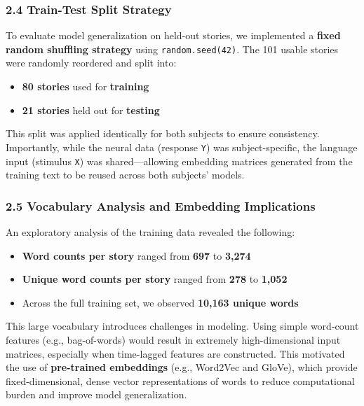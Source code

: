 \documentclass[11pt]{article}
\begin{document}
\hypertarget{train-test-split-strategy}{%
\subsubsection{2.4 Train-Test Split
Strategy}\label{train-test-split-strategy}}

To evaluate model generalization on held-out stories, we implemented a
\textbf{fixed random shuffling strategy} using \texttt{random.seed(42)}.
The 101 usable stories were randomly reordered and split into:

\begin{itemize}
\item
  \textbf{80 stories} used for \textbf{training}
\item
  \textbf{21 stories} held out for \textbf{testing}
\end{itemize}

This split was applied identically for both subjects to ensure
consistency. Importantly, while the neural data (response \texttt{Y})
was subject-specific, the language input (stimulus \texttt{X}) was
shared---allowing embedding matrices generated from the training text to
be reused across both subjects' models.

\hypertarget{vocabulary-analysis-and-embedding-implications}{%
\subsubsection{2.5 Vocabulary Analysis and Embedding
Implications}\label{vocabulary-analysis-and-embedding-implications}}

An exploratory analysis of the training data revealed the following:

\begin{itemize}
\item
  \textbf{Word counts per story} ranged from \textbf{697} to
  \textbf{3,274}
\item
  \textbf{Unique word counts per story} ranged from \textbf{278} to
  \textbf{1,052}
\item
  Across the full training set, we observed \textbf{10,163 unique words}
\end{itemize}

This large vocabulary introduces challenges in modeling. Using simple
word-count features (e.g., bag-of-words) would result in extremely
high-dimensional input matrices, especially when time-lagged features
are constructed. This motivated the use of \textbf{pre-trained
embeddings} (e.g., Word2Vec and GloVe), which provide fixed-dimensional,
dense vector representations of words to reduce computational burden and
improve model generalization.
\end{document}
